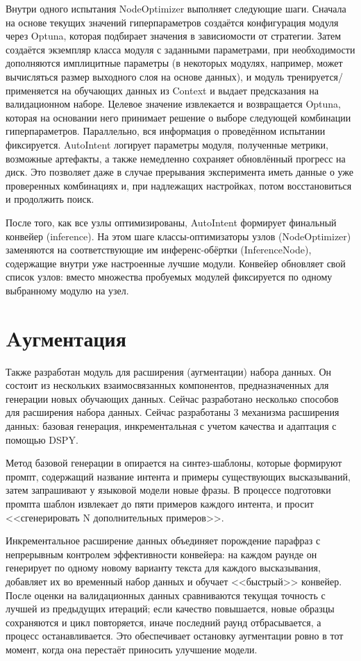 \documentclass[14pt,a4paper,oneside,openany]{extbook}
\begin{document}
Внутри одного испытания NodeOptimizer выполняет следующие шаги. Сначала на основе текущих значений гиперпараметров создаётся конфигурация модуля через Optuna, которая подбирает значения в зависиомости от стратегии. Затем создаётся экземпляр класса модуля с заданными параметрами, при необходимости дополняются имплицитные параметры (в некоторых модулях, например, может вычисляться размер выходного слоя на основе данных), и модуль тренируется/применяется на обучающих данных из Context и выдает предсказания на валидационном наборе. Целевое значение извлекается и возвращается Optuna, которая на основании него принимает решение о выборе следующей комбинации гиперпараметров. Параллельно, вся информация о проведённом испытании фиксируется. AutoIntent логирует параметры модуля, полученные метрики, возможные артефакты, а также немедленно сохраняет обновлённый прогресс на диск. Это позволяет даже в случае прерывания эксперимента иметь данные о уже проверенных комбинациях и, при надлежащих настройках, потом восстановиться и продолжить поиск.

После того, как все узлы оптимизированы, AutoIntent формирует финальный конвейер (inference). На этом шаге классы-оптимизаторы узлов (NodeOptimizer) заменяются на соответствующие им инференс-обёртки (InferenceNode), содержащие внутри уже настроенные лучшие модули. Конвейер обновляет свой список узлов: вместо множества пробуемых модулей фиксируется по одному выбранному модулю на узел.
\section{Aугментация}
\label{sec:orga4f9b5e}
Также разработан модуль для расширения (аугментации) набора данных. Он состоит из нескольких взаимосвязанных компонентов, предназначенных для генерации новых обучающих данных. Сейчас разработано несколько способов для расширения набора данных. Сейчас разработаны 3 механизма расширения данных: базовая генерация, инкрементальная с учетом качества и адаптация с помощью DSPY\autocite{khattab_dspy_2023}.

Метод базовой генерации в опирается на синтез-шаблоны, которые формируют промпт, содержащий название интента и примеры существующих высказываний, затем запрашивают у языковой модели новые фразы. В процессе подготовки промпта шаблон извлекает до пяти примеров каждого интента, и просит {}<<сгенерировать N дополнительных примеров>>{}.

Инкрементальное расширение данных объединяет порождение парафраз с непрерывным контролем эффективности конвейера: на каждом раунде он генерирует по одному новому варианту текста для каждого высказывания, добавляет их во временный набор данных и обучает {}<<быстрый>>{} конвейер. После оценки на валидационных данных сравниваются текущая точность с лучшей из предыдущих итераций; если качество повышается, новые образцы сохраняются и цикл повторяется, иначе последний раунд отбрасывается, а процесс останавливается. Это обеспечивает остановку аугментации ровно в тот момент, когда она перестаёт приносить улучшение модели.
\end{document}
